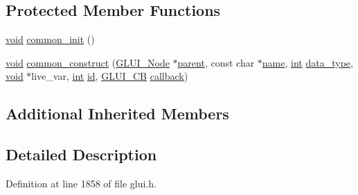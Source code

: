 \subsection*{Protected Member Functions}
\begin{DoxyCompactItemize}
\item 
\hyperlink{wglext_8h_a9e6b7f1933461ef318bb000d6bd13b83}{void} \hyperlink{class_g_l_u_i___spinner_a796a4c94a59a4b5db0672cc3bbf2562e}{common\+\_\+init} ()
\item 
\hyperlink{wglext_8h_a9e6b7f1933461ef318bb000d6bd13b83}{void} \hyperlink{class_g_l_u_i___spinner_af99b5ae2b431195f494d8bdb45f3a79e}{common\+\_\+construct} (\hyperlink{class_g_l_u_i___node}{G\+L\+U\+I\+\_\+\+Node} $\ast$\hyperlink{class_g_l_u_i___node_a8ed65d447784f6f88bd3e2e2bcac6cdb}{parent}, const char $\ast$\hyperlink{glext_8h_ad977737dfc9a274a62741b9500c49a32}{name}, \hyperlink{wglext_8h_a500a82aecba06f4550f6849b8099ca21}{int} \hyperlink{class_g_l_u_i___spinner_a821f0e5b5f040f93f53ee7441abfc44e}{data\+\_\+type}, \hyperlink{wglext_8h_a9e6b7f1933461ef318bb000d6bd13b83}{void} $\ast$live\+\_\+var, \hyperlink{wglext_8h_a500a82aecba06f4550f6849b8099ca21}{int} \hyperlink{glext_8h_a58c2a664503e14ffb8f21012aabff3e9}{id}, \hyperlink{class_g_l_u_i___c_b}{G\+L\+U\+I\+\_\+\+C\+B} \hyperlink{class_g_l_u_i___control_a96060fe0cc6d537e736dd6eef78e24ab}{callback})
\end{DoxyCompactItemize}
\subsection*{Additional Inherited Members}


\subsection{Detailed Description}


Definition at line 1858 of file glui.\+h.



